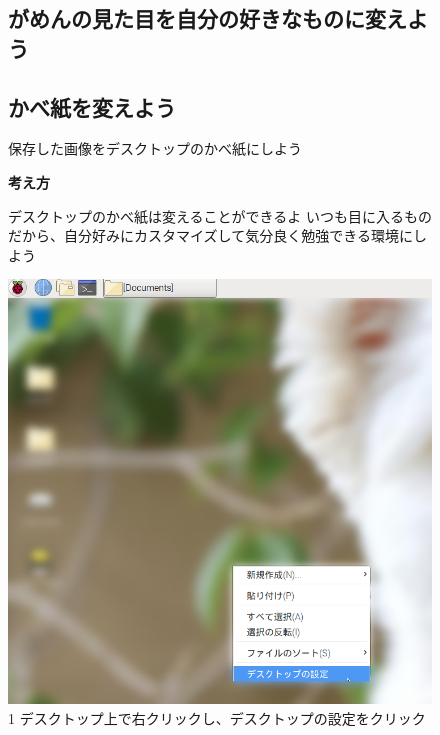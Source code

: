 \documentclass[a4paper,12pt]{jarticle}
\begin{document}
\begin{figure}
  \subsection{がめんの見た目を自分の好きなものに変えよう}
  \subsection{\theExercise かべ紙を変えよう}
  保存した画像をデスクトップのかべ紙にしよう

  \textbf{考え方}


  \bigskip



  \centering
  \begin{minipage}{\textwidth}
    \begin{minipage}{\textwidth}
      デスクトップのかべ紙は変えることができるよ
      いつも目に入るものだから、自分好みにカスタマイズして気分良く勉強できる環境にしよう
    \end{minipage}
    \begin{minipage}{0.45\textwidth}
      \includegraphics[width=0.85\linewidth]{textbook-img107.png}\\
      1 デスクトップ上で右クリックし、デスクトップの設定をクリック
    \end{minipage}
    \begin{minipage}{2.582cm}

\end{minipage}
\end{minipage}
\end{figure}
\end{document}
